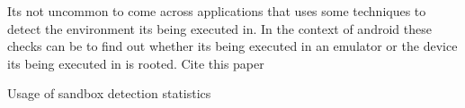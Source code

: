 \documentclass[../main.tex]{subfile}
\begin{document}
	
	Its not uncommon to come across applications that uses some techniques to detect the environment its being executed in. In the context of android these checks can be to find out whether its being executed in an emulator or the device its being executed in is rooted. Cite this paper \cite{geist2016jailbreak} \cite{sun2015android} \cite{lim2016android}
	
	Usage of sandbox detection statistics \cite{amro2018malware}
	
	
	
			
\end{document}
